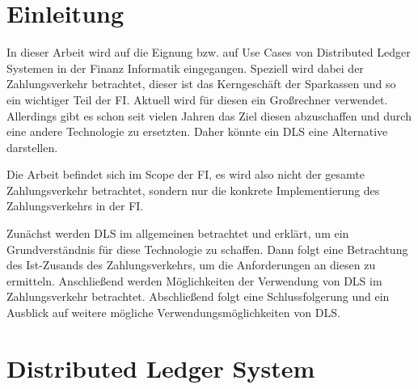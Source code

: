 \documentclass[12pt, a4paper]{article}
\begin{document}
    {
        \setcounter{section}{0}
        \setcounter{page}{1}



    \renewcommand{\figurename}{Abb.}


\noindent %

\section{Einleitung}

In dieser Arbeit wird auf die Eignung bzw. auf Use Cases von Distributed Ledger Systemen in der Finanz Informatik eingegangen.
Speziell wird dabei der Zahlungsverkehr betrachtet, dieser ist das Kerngeschäft der Sparkassen und so ein wichtiger Teil der FI.
Aktuell wird für diesen ein Großrechner verwendet.
Allerdings gibt es schon seit vielen Jahren das Ziel diesen abzuschaffen und durch eine andere Technologie zu ersetzten.
Daher könnte ein DLS eine Alternative darstellen.

\noindent
Die Arbeit befindet sich im Scope der FI, es wird also nicht der gesamte Zahlungsverkehr betrachtet, sondern nur die konkrete Implementierung des Zahlungsverkehrs in der FI.

\noindent
Zunächst werden DLS im allgemeinen betrachtet und erklärt, um ein Grundverständnis für diese Technologie zu schaffen.
Dann folgt eine Betrachtung des Ist-Zusands des Zahlungsverkehrs, um die Anforderungen an diesen zu ermitteln.
Anschließend werden Möglichkeiten der Verwendung von DLS im Zahlungsverkehr betrachtet.
Abschließend folgt eine Schlussfolgerung und ein Ausblick auf weitere mögliche Verwendungsmöglichkeiten von DLS.    
\noindent

\noindent

\section{Distributed Ledger System}
\label{sec:definition-dls}

}
\end{document}
